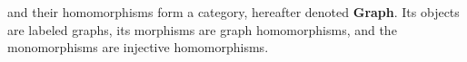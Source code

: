 \begin{example}
     and their homomorphisms form a category, hereafter denoted \textbf{Graph}. Its objects are labeled graphs, its morphisms are graph homomorphisms, and the monomorphisms are injective homomorphisms.
\end{example}
